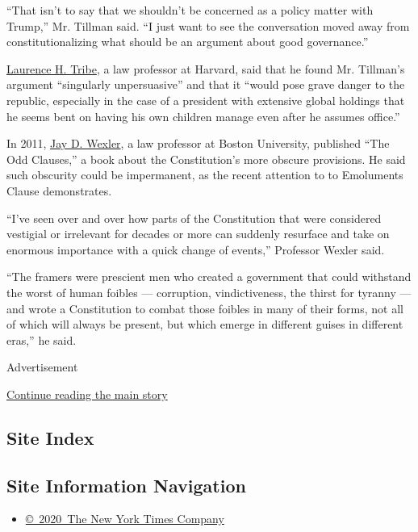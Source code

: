 ``That isn't to say that we shouldn't be concerned as a policy matter
with Trump,'' Mr. Tillman said. ``I just want to see the conversation
moved away from constitutionalizing what should be an argument about
good governance.''

\href{http://hls.harvard.edu/faculty/directory/10899/Tribe}{Laurence H.
Tribe}, a law professor at Harvard, said that he found Mr. Tillman's
argument ``singularly unpersuasive'' and that it ``would pose grave
danger to the republic, especially in the case of a president with
extensive global holdings that he seems bent on having his own children
manage even after he assumes office.''

In 2011, \href{https://www.bu.edu/law/profile/jay-d-wexler/}{Jay D.
Wexler}, a law professor at Boston University, published ``The Odd
Clauses,'' a book about the Constitution's more obscure provisions. He
said such obscurity could be impermanent, as the recent attention to to
Emoluments Clause demonstrates.

``I've seen over and over how parts of the Constitution that were
considered vestigial or irrelevant for decades or more can suddenly
resurface and take on enormous importance with a quick change of
events,'' Professor Wexler said.

``The framers were prescient men who created a government that could
withstand the worst of human foibles --- corruption, vindictiveness, the
thirst for tyranny --- and wrote a Constitution to combat those foibles
in many of their forms, not all of which will always be present, but
which emerge in different guises in different eras,'' he said.

Advertisement

\protect\hyperlink{after-bottom}{Continue reading the main story}

\hypertarget{site-index}{%
\subsection{Site Index}\label{site-index}}

\hypertarget{site-information-navigation}{%
\subsection{Site Information
Navigation}\label{site-information-navigation}}

\begin{itemize}
\tightlist
\item
  \href{https://help.nytimes.com/hc/en-us/articles/115014792127-Copyright-notice}{©~2020~The
  New York Times Company}
\end{itemize}

